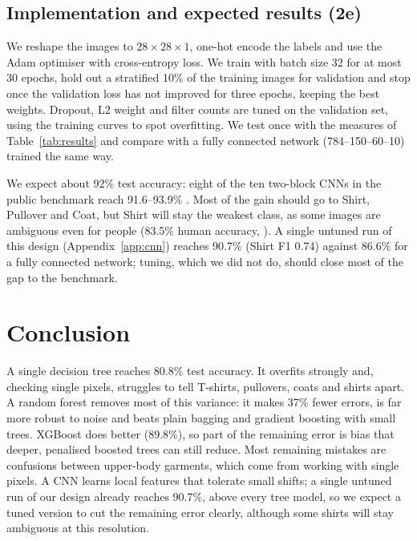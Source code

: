 \documentclass[11pt,a4paper]{article}
\begin{document}
\subsection{Implementation and expected results (2e)}
We reshape the images to $28\times28\times1$, one-hot encode the labels and use the Adam optimiser with cross-entropy loss. We train with batch size 32 for at most 30 epochs, hold out a stratified 10\% of the training images for validation and stop once the validation loss has not improved for three epochs, keeping the best weights. Dropout, L2 weight and filter counts are tuned on the validation set, using the training curves to spot overfitting. We test once with the measures of Table~\ref{tab:results} and compare with a fully connected network (784--150--60--10) trained the same way.

We expect about 92\% test accuracy: eight of the ten two-block CNNs in the public benchmark reach 91.6--93.9\% \citep{fmnistbenchmark}. Most of the gain should go to Shirt, Pullover and Coat, but Shirt will stay the weakest class, as some images are ambiguous even for people (83.5\% human accuracy, \citealp{fmnistbenchmark}). A single untuned run of this design (Appendix~\ref{app:cnn}) reaches 90.7\% (Shirt F1 0.74) against 86.6\% for a fully connected network; tuning, which we did not do, should close most of the gap to the benchmark.

\section{Conclusion}
A single decision tree reaches 80.8\% test accuracy. It overfits strongly and, checking single pixels, struggles to tell T-shirts, pullovers, coats and shirts apart. A random forest removes most of this variance: it makes 37\% fewer errors, is far more robust to noise and beats plain bagging and gradient boosting with small trees. XGBoost does better (89.8\%), so part of the remaining error is bias that deeper, penalised boosted trees can still reduce. Most remaining mistakes are confusions between upper-body garments, which come from working with single pixels. A CNN learns local features that tolerate small shifts; a single untuned run of our design already reaches 90.7\%, above every tree model, so we expect a tuned version to cut the remaining error clearly, although some shirts will stay ambiguous at this resolution.
\end{document}
